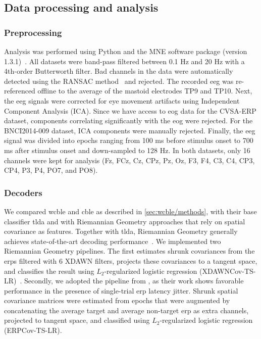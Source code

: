 \subsection{Data processing and analysis}
\subsubsection{Preprocessing}
Analysis was performed using Python and the MNE software package (version
1.3.1)~\cite{Gramfort2013}.
All datasets were band-pass filtered between 0.1 Hz and 20 Hz with a 4th-order Butterworth filter.
Bad channels in the data were automatically detected using the RANSAC
method~\cite{Fischler1981} and rejected.
The recorded \ac{eeg} was re-referenced
offline to the average of the mastoid electrodes TP9 and TP10.
Next, the \ac{eeg} signals were corrected for eye movement artifacts using
Independent Component Analysis (ICA).
Since we have access to \ac{eog} data for the CVSA-ERP dataset, components correlating
significantly with the \ac{eog} were rejected.
For the BNCI2014-009 dataset, ICA components were manually rejected.
Finally, the \ac{eeg} signal was divided into epochs ranging from 100 ms before stimulus onset to 700 ms after stimulus onset and down-sampled to 128 Hz.
In both datasets, only 16 channels were kept for
analysis (Fz, FCz, Cz, CPz, Pz, Oz, F3, F4, C3, C4, CP3, CP4, P3, P4, PO7, and
PO8).

\subsubsection{Decoders}
\label{sec:covert-align/methods/decoders}
We compared \ac{wcble} and \ac{cble} as described in
\cref{sec:wcble/methods}, with their base classifier \ac{tlda} and with
Riemannian Geometry approaches that rely on spatial covariance as features.
Together with \ac{tlda}, Riemannian Geometry generally achieves state-of-the-art decoding
performance~\cite{Lotte2018}.
We implemented two Riemannian Geometry pipelines.
The first estimates shrunk covariances from the \acp{erp} filtered with 6 XDAWN
filters, projects these covariances to a tangent space, and classifies the
result using $L_2$-regularized logistic regression
(XDAWNCov-TS-LR)~\cite{Cecotti2017}.
Secondly, we adopted the pipeline from \cite{Aydarkhanov2020}, as their work shows
favorable performance in the presence of single-trial \ac{erp} latency jitter.
Shrunk spatial covariance matrices were estimated from epochs that were
augmented by concatenating the average target and average non-target \ac{erp} as
extra channels, projected to tangent space, and classified using
$L_2$-regularized logistic regression (ERPCov-TS-LR).

